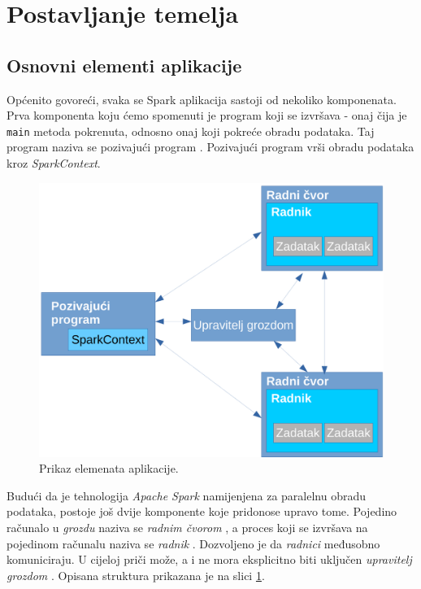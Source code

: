\documentclass[times, utf8, zavrsni, numeric]{fer}
\begin{document}
\section{Postavljanje temelja}
\subsection{Osnovni elementi aplikacije}
Općenito govoreći, svaka se Spark aplikacija sastoji  od nekoliko komponenata. Prva komponenta koju ćemo spomenuti je program koji se izvršava - onaj čija je \texttt{main} metoda pokrenuta, odnosno onaj koji pokreće obradu podataka. Taj program naziva se pozivajući program . Pozivajući program vrši obradu podataka kroz  \emph{SparkContext}.

\begin{figure}[htb]
\centering
\includegraphics[scale=0.55]{img/elementiAplikacijeCropped.pdf}
\caption{Prikaz elemenata aplikacije.}
\label{fig:cluster-overview}
\end{figure}

Budući da je tehnologija \emph{Apache Spark} namijenjena za paralelnu obradu podataka, postoje još dvije komponente koje pridonose upravo tome. Pojedino računalo u \emph{grozdu}  naziva se \emph{radnim čvorom} , a proces koji se izvršava na pojedinom računalu naziva se \emph{radnik} . Dozvoljeno je da \emph{radnici} međusobno komuniciraju. U cijeloj priči može, a i ne mora eksplicitno biti uključen \emph{upravitelj grozdom} .
Opisana struktura prikazana je na slici \ref{fig:cluster-overview}.
\end{document}
